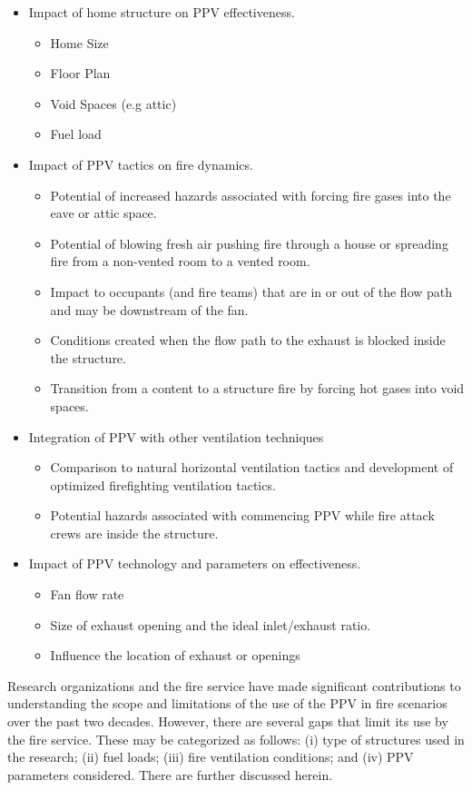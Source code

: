 \documentclass{article}
\begin{document}
\begin{itemize}
	\item Impact of home structure on PPV effectiveness.
	\begin{itemize}
		\item Home Size
		\item Floor Plan
		\item Void Spaces (e.g attic)
		\item Fuel load
	\end{itemize}
	\item Impact of PPV tactics on fire dynamics.
	\begin{itemize}
		\item Potential of increased hazards associated with forcing fire gases into the eave or attic space.
		\item Potential of blowing fresh air pushing fire through a house or spreading fire from a non-vented room to a vented room.
		\item Impact to occupants (and fire teams) that are in or out of the flow path and may be downstream of the fan.
		\item Conditions created when the flow path to the exhaust is blocked inside the structure.
		\item Transition from a content to a structure fire by forcing hot gases into void spaces.
	\end{itemize}
	\item Integration of PPV with other ventilation techniques
	\begin{itemize}
		\item Comparison to natural horizontal ventilation tactics and development of optimized firefighting ventilation tactics.
		\item Potential hazards associated with commencing PPV while fire attack crews are inside the structure.
	\end{itemize}
	\item Impact of PPV technology and parameters on effectiveness.
	\begin{itemize}
		\item Fan flow rate
		\item Size of exhaust opening and the ideal inlet/exhaust ratio.
		\item Influence the location of exhaust or openings
	\end{itemize}
\end{itemize}

Research organizations and the fire service have made significant contributions to understanding the scope and limitations of the use of the PPV in fire scenarios over the past two decades. However, there are several gaps that limit its use by the fire service. These may be categorized as follows: (i) type of structures used in the research; (ii) fuel loads; (iii) fire ventilation conditions; and (iv) PPV parameters considered. There are further discussed herein. \par
\end{document}
